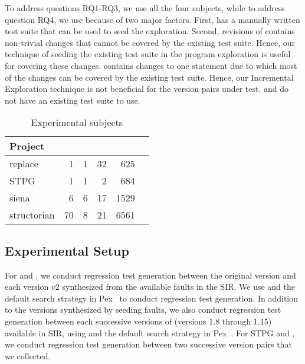To address questions RQ1-RQ3, we use all the four subjects, while to address question RQ4, we use  because of two major factors. First,  has a manually written test suite that can be used to seed the exploration. Second, revisions of  contains non-trivial changes that cannot be covered by the existing test suite. Hence, our technique of seeding the existing test suite in the program exploration is useful for covering these changes.  contains changes to one statement due to which most of the changes can be covered by the existing test suite.
Hence, our Incremental Exploration technique is not beneficial for the version pairs under test.
  and  do not have an existing test suite to use.

\setlength{\tabcolsep}{6pt}
\begin{table}
\begin{CodeOut}
\begin{center}
\caption {\label{table:subjects}Experimental subjects}
\begin {tabular} {|l|r|r|r|r|r|}
\hline
Project&\CenterCell{Classes}&\CenterCell{Classes Covered}&\CenterCell{Versions}&\CenterCell{LOC}\\

\hline
\hline replace &1&1&32&625\\
\hline STPG &1&1&2&684\\
\hline siena &6&6&17&1529\\
\hline structorian &70&8&21&6561\\
\hline
\end{tabular}
\end{center}
\end{CodeOut}
\vspace{- 0.3 in}
\end{table}



\subsection{Experimental Setup}
For  and , we conduct regression test generation between the original version and each version $v2$ synthesized from the available faults in the SIR. We use  and the default search strategy in Pex~\cite{Pex,fitnex} to conduct regression test generation. In addition to the versions synthesized by seeding faults, we also conduct regression test generation between each successive versions of  (versions 1.8 through 1.15) available in SIR, using  and the default search strategy in Pex~\cite{Pex,fitnex}. For STPG and , we conduct regression test generation between two successive version pairs that we collected. 

